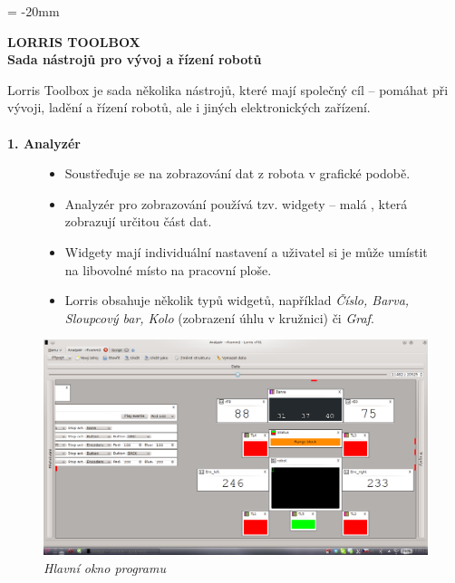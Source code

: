\documentclass[17pt]{extreport}
\newcommand{\B}{\textbf} %
\newcommand{\It}{\textit}  %
\begin{document}

\pagestyle{empty} %

\voffset = -20mm %
\enlargethispage{100mm} %

\begin{center}
    \Large \B{LORRIS TOOLBOX \\ Sada nástrojů pro vývoj a řízení robotů}
\end{center}
\vspace{5mm}
\setlength{\footskip}{0pt}
\setlength{\textheight}{750pt}
Lorris Toolbox je sada několika nástrojů, které mají společný cíl -- pomáhat při vývoji, ladění a řízení robotů, ale i jiných elektronických zařízení.\\ \\
{\large \B{ 1. Analyzér }}
\begin{figure}[ht]
    \begin{minipage}[t]{0.48\linewidth}
    \begin{itemize} 
        \item Soustřeďuje se na zobrazování dat z robota v grafické podobě.
        \item Analyzér pro zobrazování používá tzv. widgety -- malá , která zobrazují určitou část dat.
        \item Widgety mají individuální nastavení a uživatel si je může umístit na libovolné místo na pracovní ploše.
        \item Lorris obsahuje několik typů widgetů, například \It{Číslo, Barva, Sloupcový bar, Kolo} (zobrazení úhlu v kružnici) či \It{Graf}.
    \end{itemize}
    \end{minipage}
    \hfill
    \begin{minipage}[t]{0.50\linewidth}
        \vspace{0pt}
        \includegraphics[width=\linewidth]{img/screen.png}
        \centering \It{Hlavní okno programu}
    \end{minipage}
\end{figure}
\end{document}
